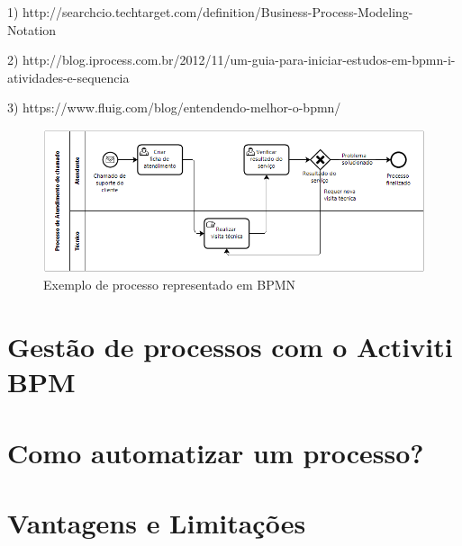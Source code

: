 1) http://searchcio.techtarget.com/definition/Business-Process-Modeling-Notation

2) http://blog.iprocess.com.br/2012/11/um-guia-para-iniciar-estudos-em-bpmn-i-atividades-e-sequencia

3) https://www.fluig.com/blog/entendendo-melhor-o-bpmn/

\begin{figure}
  \centering
  \includegraphics[width=1.0\textwidth]{imagens/bpmn_example.png}
  \caption{Exemplo de processo representado em BPMN}
  \label{fig:LABEL_FIG_1}
\end{figure}

\section{Gestão de processos com o Activiti BPM}\label{sec:LABEL_CHP_4_SEC_C}

\section{Como automatizar um processo?}\label{sec:LABEL_CHP_4_SEC_D}

\section{Vantagens e Limitações}\label{sec:LABEL_CHP_4_SEC_E}


